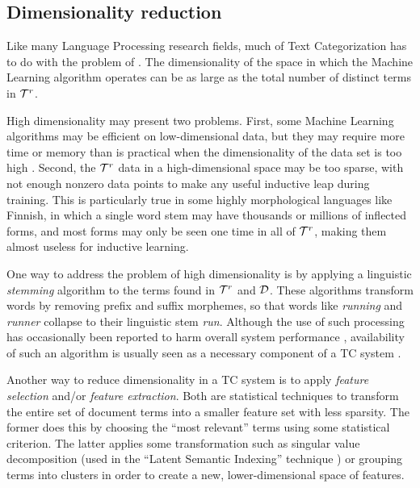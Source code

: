 \subsection{Dimensionality reduction}
\label{dim-reduction}

Like many Language Processing research fields, much of Text Categorization has
to do with the problem of 
\cite[p. 13]{sebastiani:02} \cite{joachims:98}.  The
dimensionality of the space in which the Machine Learning algorithm
operates can be as large as the total number of distinct terms in
$\mathcal{T}^r$.

High dimensionality may present two problems.  First, some Machine
Learning algorithms may be efficient on low-dimensional data, but they
may require more time or memory than is practical when the
dimensionality of the data set is too high \cite{chakrabarti:98}.
Second, the
$\mathcal{T}^r$ data in a high-dimensional space may be too sparse, with
not enough nonzero data points to make any useful inductive leap
during training.  This is particularly true in some highly
morphological languages like Finnish, in which a single word stem may
have thousands or millions of inflected forms, and most forms may only
be seen one time in all of $\mathcal{T}^r$, making them almost useless for
inductive learning.

One way to address the problem of high dimensionality is by applying a
linguistic \emph{stemming} algorithm to the terms found in $\mathcal{T}^r$
and $\mathcal{D}$.  These algorithms transform words by removing prefix and
suffix morphemes, so that words like \emph{running} and \emph{runner}
collapse to their linguistic stem \emph{run}.  Although the use of
such processing has occasionally been reported to harm overall system
performance \cite{baker:98}, availability of such an algorithm is
usually seen as a necessary component of a TC
system \cite[p. 12]{sebastiani:02}.

Another way to reduce dimensionality in a TC system is to apply
\emph{feature selection} and/or \emph{feature extraction}.  Both are
statistical techniques to transform the entire set of document terms
into a smaller feature set with less sparsity.  The former does this
by choosing the ``most relevant'' terms using some statistical
criterion.  The latter
applies some transformation such as singular value decomposition (used
in the ``Latent Semantic Indexing'' technique \cite{deerwester:90}) or
grouping terms into clusters in
order to create a new, lower-dimensional space of features.

